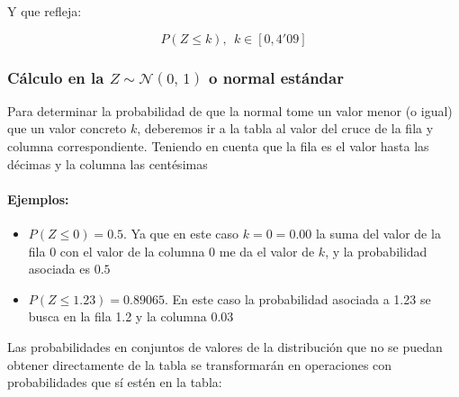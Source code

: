 Y que refleja:

$$P\left(Z\leq k \right), \ \  k \in \left[ 0 , 4'09 \right]$$
\begin{center}
    
\end{center}

\subsubsection{Cálculo en la $Z \sim \mathcal{N}(0,\,1)$ o normal estándar}
Para determinar la probabilidad de que la normal tome un valor menor (o igual) que un valor concreto $k$, deberemos ir a la tabla al valor del cruce de la fila y columna correspondiente. Teniendo en cuenta que la fila es el valor hasta las décimas y la columna las centésimas
\paragraph{Ejemplos:} 
\begin{itemize}
    \item $P\left(Z\leq 0 \right)=0.5 $. Ya que en este caso $k=0=0.00$ la suma del valor de la fila 0 con el valor de la columna 0 me da el valor de $k$, y la probabilidad asociada es $0.5$
    \item $P\left(Z\leq 1.23 \right)= 0.89065$. En este caso la probabilidad asociada a 1.23 se busca en la fila 1.2 y la columna 0.03 
\end{itemize}


Las probabilidades en conjuntos de valores de la distribución que no se puedan obtener directamente de la tabla se transformarán en operaciones con probabilidades que sí estén en la tabla:

